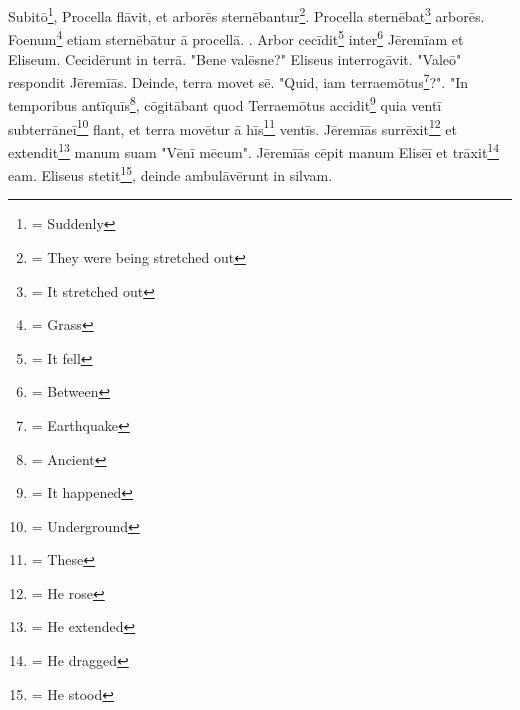 Subitō\footnote{\textbf{} = Suddenly}, Procella flāvit, et arborēs sternēbantur\footnote{\textbf{} = They were being stretched out}. Procella sternēbat\footnote{\textbf{} = It stretched out} arborēs. Foenum\footnote{\textbf{} = Grass} etiam sternēbātur ā procellā. . Arbor cecīdit\footnote{\textbf{} = It fell} inter\footnote{\textbf{} = Between} Jēremīam et Eliseum. Cecidērunt in terrā. "Bene valēsne?" Eliseus interrogāvit. "Valeō" respondit Jēremīās.  Deinde, terra movet sē. "Quid, iam terraemōtus\footnote{\textbf{} = Earthquake}?". "In temporibus antīquīs\footnote{\textbf{} = Ancient}, cōgitābant quod Terraemōtus accidit\footnote{\textbf{} = It happened} quia ventī subterrāneī\footnote{\textbf{} = Underground} flant, et terra movētur ā hīs\footnote{\textbf{} = These} ventīs. Jēremīās surrēxit\footnote{\textbf{} = He rose} et extendit\footnote{\textbf{} = He extended} manum suam "Vēnī mēcum". Jēremīās cēpit manum Elisēī et trāxit\footnote{\textbf{} = He dragged} eam. Eliseus stetit\footnote{\textbf{} = He stood}, deinde ambulāvērunt in silvam.